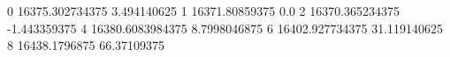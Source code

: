 0 16375.302734375 3.494140625
1 16371.80859375 0.0
2 16370.365234375 -1.443359375
4 16380.6083984375 8.7998046875
6 16402.927734375 31.119140625
8 16438.1796875 66.37109375
